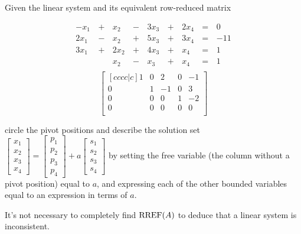 \begin{applicationActivities}{3}{5}
\begin{activity}{10}
  Given the linear system and its equivalent row-reduced matrix
  \begin{multicols}{2}\noindent
    \begin{alignat*}{5}
      -x_1 &\,+\,&  x_2 &\,-\,&  3x_3 &\,+\,&  2x_4 &\,=\,& 0 \\
      2x_1 &\,-\,&  x_2 &\,+\,&  5x_3 &\,+\,&  3x_4 &\,=\,& -11 \\
      3x_1 &\,+\,& 2x_2 &\,+\,&  4x_3 &\,+\,&   x_4 &\,=\,& 1 \\
           &\, \,&  x_2 &\,-\,&   x_3 &\,+\,&   x_4 &\,=\,& 1 \\
    \end{alignat*}
  \[
    \begin{bmatrix}[cccc|c]
       1 &  0 &  2 &  0 & -1 \\
       0 &  1 & -1 &  0 &  3 \\
       0 &  0 &  0 &  1 & -2 \\
       0 &  0 &  0 &  0 &  0 \\
    \end{bmatrix}
  \]
  \end{multicols}
  circle the pivot positions and describe the solution set
  \(
    \begin{bmatrix}
      x_1 \\
      x_2 \\
      x_3 \\
      x_4
    \end{bmatrix}=
    \begin{bmatrix}
      p_1 \\
      p_2 \\
      p_3 \\
      p_4
    \end{bmatrix}
    +a\begin{bmatrix}
      s_1 \\
      s_2 \\
      s_3 \\
      s_4
    \end{bmatrix}
  \) by setting the free variable (the column without a pivot position)
  equal to \(a\), and expressing each of the other
  bounded variables equal to an expression in terms of \(a\).
\end{activity}

\begin{remark}
  It's not necessary to completely find \(\operatorname{RREF}(A)\) to
  deduce that a linear system is inconsistent.
\end{remark}


\end{applicationActivities}
